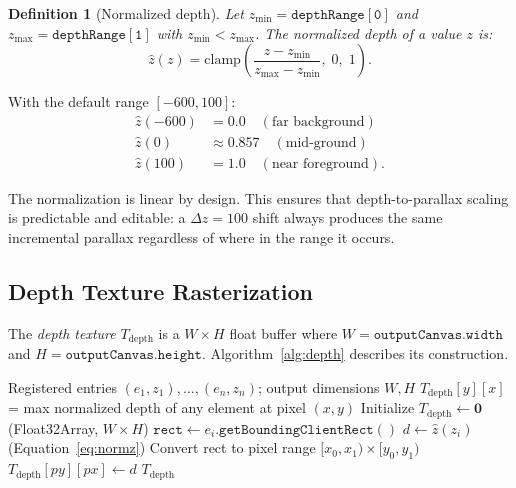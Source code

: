 \documentclass[10pt,twocolumn]{article}
\newtheorem{definition}[theorem]{Definition}
\newcommand{\zmin}{z_{\min}}
\newcommand{\zmax}{z_{\max}}
\newcommand{\normz}{\hat{z}}
\newcommand{\Tdepth}{T_{\mathrm{depth}}}
\begin{document}
\begin{definition}[Normalized depth]
\label{def:normz}
Let $\zmin = \mathtt{depthRange[0]}$ and $\zmax = \mathtt{depthRange[1]}$
with $\zmin < \zmax$.
The \emph{normalized depth} of a value $z$ is:
\begin{equation}
  \normz(z) = \mathrm{clamp}\!\left(
    \frac{z - \zmin}{\zmax - \zmin},\; 0,\; 1
  \right).
  \label{eq:normz}
\end{equation}
\end{definition}

With the default range $[-600, 100]$:
\begin{align*}
  \normz(-600) &= 0.0 \quad (\text{far background})\\
  \normz(0)    &\approx 0.857 \quad (\text{mid-ground})\\
  \normz(100)  &= 1.0 \quad (\text{near foreground}).
\end{align*}

The normalization is linear by design. This ensures that depth-to-parallax
scaling is predictable and editable: a $\Delta z = 100$ shift always
produces the same incremental parallax regardless of where in the range it
occurs.

\subsection{Depth Texture Rasterization}

The \emph{depth texture} $\Tdepth$ is a $W \times H$ float buffer where
$W = \mathtt{outputCanvas.width}$ and $H = \mathtt{outputCanvas.height}$.
Algorithm~\ref{alg:depth} describes its construction.

\begin{algorithm}[h]
\caption{Depth texture rasterization.}
\label{alg:depth}
\begin{algorithmic}[1]
\Require Registered entries $(e_1, z_1), \ldots, (e_n, z_n)$;
         output dimensions $W, H$
\Ensure $\Tdepth[y][x]$ = max normalized depth of any element at pixel $(x,y)$
\State Initialize $\Tdepth \leftarrow \mathbf{0}$ \quad (Float32Array, $W \times H$)
  \State $\mathtt{rect} \leftarrow e_i.\mathtt{getBoundingClientRect}()$
  \State $d \leftarrow \normz(z_i)$ \quad (Equation~\ref{eq:normz})
  \State Convert rect to pixel range $[x_0, x_1) \times [y_0, y_1)$
  \For{$py \in [y_0, y_1)$, $px \in [x_0, x_1)$}
    \If{$d > \Tdepth[py][px]$}
      \State $\Tdepth[py][px] \leftarrow d$
    \EndIf
  \EndFor
\EndFor
\State \Return $\Tdepth$
\end{algorithmic}
\end{algorithm}
\end{document}
